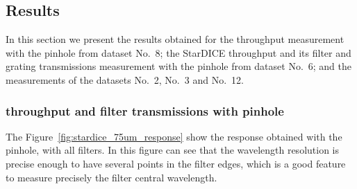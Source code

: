 %
%
%
%

\subsection{Results}

In this section we present the results obtained for the \SD throughput measurement with the \bpinhole pinhole from dataset No.~8; the StarDICE throughput and its filter and grating transmissions measurement with the \spinhole pinhole from dataset No.~6; and the measurements of the datasets No.~2, No.~3 and No.~12. 

\subsubsection{\SD throughput and filter transmissions with \spinhole pinhole}

The Figure~\ref{fig:stardice_75um_response} show the \SD response obtained with the \spinhole pinhole, with all filters. In this figure can see that the wavelength resolution is precise enough to have several points in the filter edges, which is a good feature to measure precisely the filter central wavelength. 

